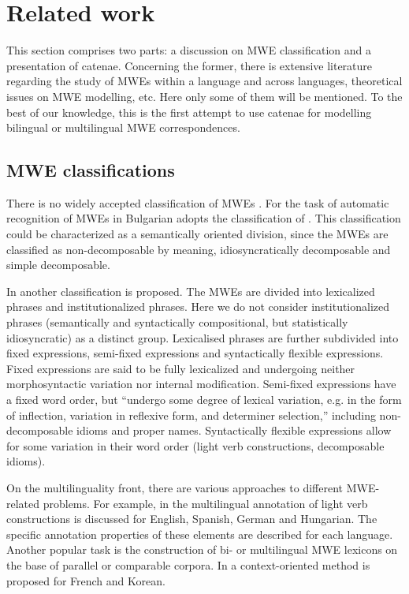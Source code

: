 \documentclass[output=paper]{langsci/langscibook}
\begin{document}
\section{Related work}
\label{RelatedWork}

This section comprises two parts: a discussion on MWE classification and a
presentation of catenae. Concerning the former, there is extensive
literature regarding the study of MWEs within a language and across languages,
theoretical issues on MWE modelling, etc. Here only some of them will be
mentioned. To the best of our knowledge, this is the first
attempt to use catenae for modelling bilingual or multilingual MWE
correspondences.

\subsection{MWE classifications}

There is no widely accepted classification of MWEs \citep{Kordoni2012}. For
the task of automatic recognition of MWEs in Bulgarian \cite{Stoyanova}
adopts the classification of \cite{baldwin2003}. This classification  could be characterized
as a semantically oriented division, since the MWEs are classified as
non-decomposable by meaning, idiosyncratically decomposable and simple
decomposable.

In \citet{Sag:2002} another classification is proposed. The MWEs are divided
into lexicalized phrases and institutionalized phrases. Here we do not
consider institutionalized phrases (semantically and syntactically
compositional, but statistically idiosyncratic) as a distinct group.
Lexicalised phrases are further subdivided into fixed expressions,
semi-fixed expressions and syntactically flexible expressions. Fixed
expressions are said to be fully lexicalized and undergoing neither
morphosyntactic variation nor internal modification. Semi-fixed expressions
have a fixed word order, but “undergo some degree of lexical variation,
e.g. in the form of inflection, variation in reflexive form, and determiner
selection,” \citet[4]{Sag:2002} including non-decomposable idioms and proper names.
Syntactically flexible expressions allow for some variation in their word
order (light verb constructions, decomposable idioms).

On the multilinguality front, there are various approaches to different
MWE-related problems. For example, in \citet{RCZ14.331} the multilingual
annotation of light verb constructions is discussed for English, Spanish,
German and Hungarian. The specific annotation properties of these elements
 are described for each language. Another popular task is the construction of
bi- or multilingual MWE lexicons on the base of parallel or comparable
corpora. In \citet{Hyeong-WonSeo} a context-oriented method is proposed for
French and Korean.
\end{document}
